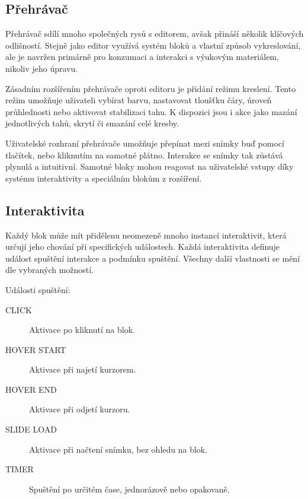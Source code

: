 \subsection{Přehrávač}

Přehrávač sdílí mnoho společných rysů s editorem, avšak přináší několik klíčových odlišností. 
Stejně jako editor využívá systém bloků a vlastní způsob vykreslování, ale je navržen primárně pro konzumaci a interakci s výukovým materiálem, nikoliv jeho úpravu.

Zásadním rozšířením přehrávače oproti editoru je přidání režimu kreslení. 
Tento režim umožňuje uživateli vybírat barvu, nastavovat tloušťku čáry, úroveň průhlednosti nebo aktivovat stabilizaci tahu. 
K dispozici jsou i akce jako mazání jednotlivých tahů, skrytí či smazání celé kresby.

Uživatelské rozhraní přehrávače umožňuje přepínat mezi snímky buď pomocí tlačítek, nebo kliknutím na samotné plátno.
Interakce se snímky tak zůstává plynulá a intuitivní. 
Samotné bloky mohou reagovat na uživatelské vstupy díky systému interaktivity a speciálním blokům z rozšíření.

\subsection{Interaktivita}

Každý blok může mít přidělenu neomezeně mnoho instancí interaktivit, která určují jeho chování při specifických událostech. 
Každá interaktivita definuje událost spuštění interakce a podmínku spuštění.
Všechny další vlastnosti se mění dle vybraných možností.

Události spuštění:
\begin{description}
  \item[CLICK] Aktivace po kliknutí na blok.
  \item[HOVER START] Aktivace při najetí kurzorem.
  \item[HOVER END] Aktivace při odjetí kurzoru.
  \item[SLIDE LOAD] Aktivace při načtení snímku, bez ohledu na blok.
  \item[TIMER] Spuštění po určitém čase, jednorázově nebo opakovaně.
\end{description}



